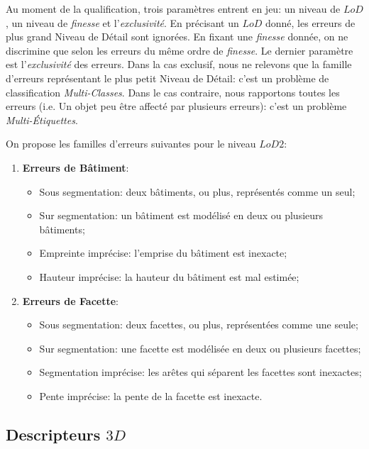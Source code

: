 \documentclass[a4paper,french]{article}
\begin{document}
    Au moment de la qualification, trois paramètres entrent en jeu: un niveau de $LoD$, un niveau de \emph{finesse} et l'\emph{exclusivité}. En précisant un $LoD$ donné, les erreurs de plus grand Niveau de Détail sont ignorées. En fixant une \emph{finesse} donnée, on ne discrimine que selon les erreurs du même ordre de \emph{finesse}. Le dernier paramètre est l'\emph{exclusivité} des erreurs. Dans la cas exclusif, nous ne relevons que la famille d'erreurs représentant le plus petit Niveau de Détail: c'est un problème de classification \textit{Multi-Classes}. Dans le cas contraire, nous rapportons toutes les erreurs (i.e. Un objet peu être affecté par plusieurs erreurs): c'est un problème \textit{Multi-\'Etiquettes}.

    On propose les familles d'erreurs suivantes pour le niveau $LoD 2$:

    \begin{enumerate}[label= (\roman*)., itemsep=0pt]
        \item \textbf{Erreurs de Bâtiment}:
        \begin{itemize}[itemsep=0pt]
            \item Sous segmentation: deux bâtiments, ou plus, représentés comme un seul;
            \item Sur segmentation: un bâtiment est modélisé en deux ou plusieurs bâtiments;
            \item Empreinte imprécise: l'emprise du bâtiment est inexacte;
            \item Hauteur imprécise: la hauteur du bâtiment est mal estimée;
        \end{itemize}
        \item \textbf{Erreurs de Facette}:
        \begin{itemize}[itemsep=0pt]
            \item Sous segmentation: deux facettes, ou plus, représentées comme une seule;
            \item Sur segmentation: une facette est modélisée en deux ou plusieurs facettes;
            \item Segmentation imprécise: les arêtes qui séparent les facettes sont inexactes;
            \item Pente imprécise: la pente de la facette est inexacte.
        \end{itemize}
    \end{enumerate}

    \subsection{Descripteurs $3D$}
\end{document}
